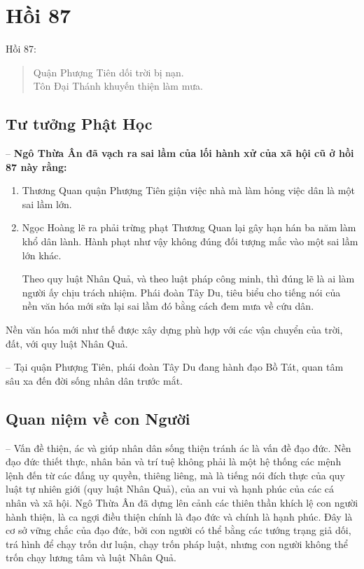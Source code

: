 \chapter{Hồi 87} %
\label{cha:hoi_87}

Hồi 87:

\begin{verse}
\begin{itshape}
Quận Phượng Tiên dối trời bị nạn.\\
Tôn Đại Thánh khuyến thiện làm mưa.
\end{itshape}
\end{verse}

\section{Tư tưởng Phật Học} %
\label{sec:87_phat_hoc}

-- {\bf Ngô Thừa Ân đã vạch ra sai lầm của lối hành xử của xã hội cũ ở hồi 87 này rằng:}

\begin{enumerate}[label=\itshape\arabic*\upshape/]
    \item Thương Quan quận Phượng Tiên giận việc nhà mà làm hỏng việc dân là một sai lầm lớn.

    \item Ngọc Hoàng lẽ ra phải trừng phạt Thương Quan lại gây hạn hán ba năm làm khổ dân lành. Hành phạt như vậy không đúng đối tượng mắc vào một sai lầm lớn khác.

    Theo quy luật Nhân Quả, và theo luật pháp công minh, thì đúng lẽ là ai làm người ấy chịu trách nhiệm. Phái đoàn Tây Du, tiêu biểu cho tiếng nói của nền văn hóa mới sửa lại sai lầm đó bằng cách đem mưa về cứu dân.
\end{enumerate}

Nền văn hóa mới như thế được xây dựng phù hợp với các vận chuyển của trời, đất, với quy luật Nhân Quả.

-- Tại quận Phượng Tiên, phái đoàn Tây Du đang hành đạo Bồ Tát, quan tâm sâu xa đến đời sống nhân dân trước mắt.

\section{Quan niệm về con Người} %
\label{sec:87_con_nguoi}

-- Vấn đề thiện, ác và giúp nhân dân sống thiện tránh ác là vấn đề đạo đức. Nền đạo đức thiết thực, nhân bản và trí tuệ không phải là một hệ thống các mệnh lệnh đến từ các đấng uy quyền, thiêng liêng, mà là tiếng nói đích thực của quy luật tự nhiên giới (quy luật Nhân Quả), của an vui và hạnh phúc của các cá nhân và xã hội. Ngô Thừa Ân đã dựng lên cảnh các thiên thần khích lệ con người hành thiện, là ca ngợi điều thiện chính là đạo đức và chính là hạnh phúc. Đây là cơ sở vững chắc của đạo đức, bởi con người có thể bằng các tướng trạng giả dối, trá hình để chạy trốn dư luận, chạy trốn pháp luật, nhưng con người không thể trốn chạy lương tâm và luật Nhân Quả.

